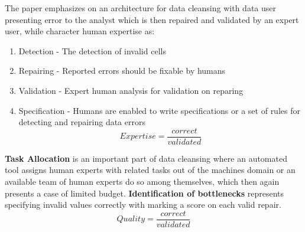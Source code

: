 \documentclass[12pt]{article}
\begin{document}
The paper emphasizes on an architecture for data cleansing with data user presenting error to the analyst which is then repaired and validated by an expert user, while character human expertise as:
\begin{enumerate}
	\item Detection - The detection of invalid cells
	\item Repairing - Reported errors should be fixable by humans
	\item Validation - Expert human analysis for validation on reparing
	\item Specification - Humans are enabled to write specifications or a set of rules for detecting and repairing data errors
	\begin{equation} Expertise = \frac{correct}{validated} \end{equation}
\end{enumerate}
\textbf{Task Allocation} is an important part of data cleansing where an automated tool assigns human experts with related tasks out of the machines domain or an available team of human experts do so among themselves, which then again presents a case of limited budget. \textbf{Identification of bottlenecks} represents specifying invalid values correctly with marking a score on each valid repair.
\begin{equation} Quality = \frac{correct}{validated} \end{equation}
\end{document}
